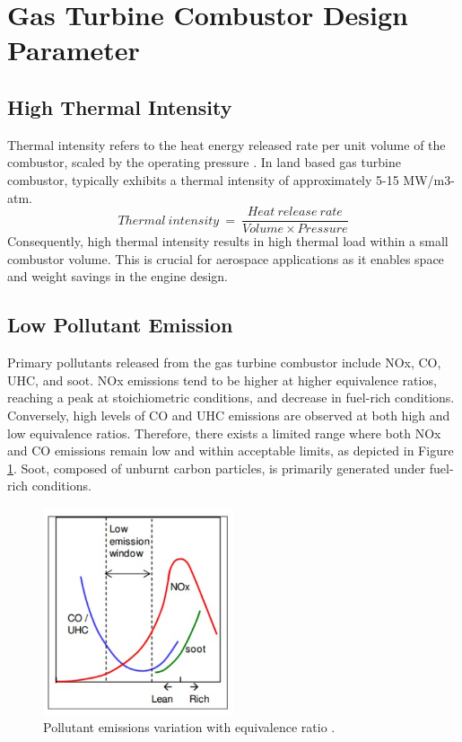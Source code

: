 \section{Gas Turbine Combustor Design Parameter}
\subsection{High Thermal Intensity}
Thermal intensity refers to the heat energy released rate per unit volume of the combustor, scaled by the operating pressure \cite{EG_1950}. In land based gas turbine combustor, typically exhibits a thermal intensity of approximately 5-15 MW/m3-atm. 
\begin{equation}
    Thermal\ intensity\ = \ \frac{Heat\ release\ rate}{Volume \times Pressure}
\end{equation}
Consequently, high thermal intensity results in high thermal load within a small combustor volume. This is crucial for aerospace applications as it enables space and weight savings in the engine design.

\subsection{Low Pollutant Emission}
Primary pollutants released from the gas turbine combustor include NOx, CO, UHC, and soot. NOx emissions tend to be higher at higher equivalence ratios, reaching a peak at stoichiometric conditions, and decrease in fuel-rich conditions. Conversely, high levels of CO and UHC emissions are observed at both high and low equivalence ratios. Therefore, there exists a limited range where both NOx and CO emissions remain low and within acceptable limits, as depicted in Figure \ref{PollEq}. Soot, composed of unburnt carbon particles, is primarily generated under fuel-rich conditions.
\begin{figure}[ht]
	\centering
	\includegraphics[width=0.5\textwidth]{Chapter1/Images/emissionWithEq.jpeg}
	\caption[Pollutant emissions variation with equivalence ratio]{Pollutant emissions variation with equivalence ratio \cite{SKG2017}.}
	\label{PollEq}
\end{figure}

